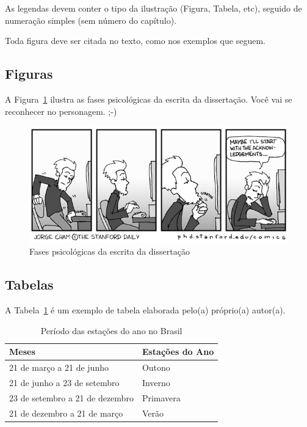 \documentclass[twoside,english,brazilian]{UNISINOSmonografia}
\begin{document}
As legendas devem conter o tipo da ilustração (Figura, Tabela, etc), seguido de numeração simples (sem número do capítulo).

Toda figura deve ser citada no texto, como nos exemplos que seguem.

\subsection{Figuras}
A Figura~\ref{fig:escrita} ilustra as fases psicológicas da escrita da dissertação. Você vai se reconhecer no personagem. ;-)

\begin{figure}
	\caption{Fases psicológicas da escrita da dissertação}
	\label{fig:escrita}
	\centering%
	\begin{minipage}{.8\textwidth}
		\includegraphics[width=\textwidth]{escrita}
	\end{minipage}
\end{figure}

\subsection{Tabelas}
A Tabela~\ref{tab:estacoes} é um exemplo de tabela elaborada pelo(a) próprio(a) autor(a).

\begin{table}
	\caption{Período das estações do ano no Brasil}
	\label{tab:estacoes}
	\centering%
	\begin{minipage}{.6\textwidth}
		\begin{tabular*}{\textwidth}{ll}
			\hline
			\textbf{Meses} & \textbf{Estações do Ano}\\
			\hline
			21 de março a 21 de junho & Outono\\
			21 de junho a 23 de setembro & Inverno\\
			23 de setembro a 21 de dezembro & Primavera\\
			21 de dezembro a 21 de março & Verão\\
			\hline
		\end{tabular*}
	\end{minipage}
\end{table}
\end{document}
